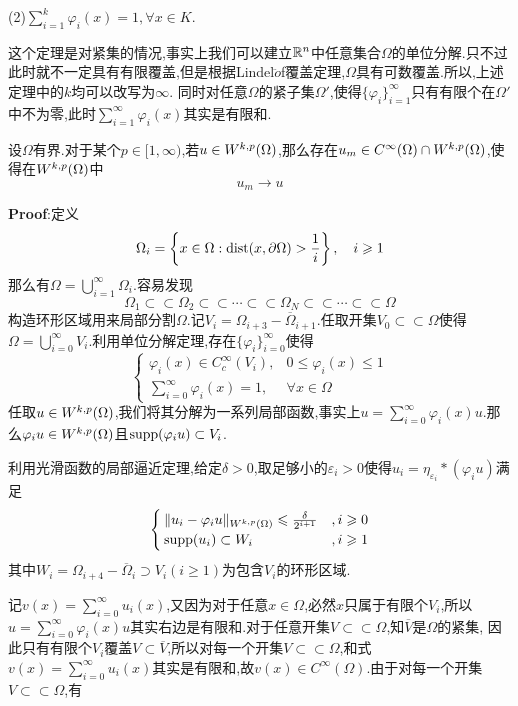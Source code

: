    (2)$\sum^k_{i=1}\varphi _i(x)=1,\forall x\in K$.\par
这个定理是对紧集的情况,事实上我们可以建立$\mathbb{R}^n$中任意集合$\Omega$的单位分解.只不过此时就不一定具有有限覆盖,但是根据Lindel$\ddot{o}$f覆盖定理,$\Omega$具有可数覆盖.所以,上述定理中的$k$均可以改写为$\infty$.
同时对任意$\Omega$的紧子集$\Omega'$,使得$\{\varphi_i\}_{i=1}^{\infty}$只有有限个在$\Omega'$中不为零,此时$\sum^{\infty}_{i=1}\varphi _i(x)$其实是有限和.\par
\begin{tcolorbox}[colback=KuangNei,colframe=BianKuang,title=\textbf{光滑函数的全局逼近},sharpish corners]
   设$\Omega$有界.对于某个$p\in[1,\infty)$,若$u\in W^{k,p}(\Omega)$,那么存在$u_m\in C^{\infty}(\Omega)\cap W^{k,p}(\Omega)$,使得在$W^{k,p}(\Omega)$中
   $$
    u_m\to u
   $$
\end{tcolorbox}
\textbf{Proof}:定义
$$
\Omega_{i}=\left\{x\in \Omega:\operatorname{dist}(x,\partial \Omega)>\frac{1}{i}\right\},\quad i\geqslant 1
$$
那么有$\Omega=\bigcup_{i=1}^{\infty}\Omega_i$.容易发现
$$
\Omega_1\subset\subset \Omega_2\subset\subset\cdots\subset\subset \Omega_N\subset\subset\cdots\subset\subset\Omega
$$
构造环形区域用来局部分割$\Omega$.记$V_i=\Omega_{i+3}-\overline{\Omega}_{i+1}$.任取开集$V_0\subset\subset \Omega$使得$\Omega=\bigcup_{i=0}^{\infty}V_i$.利用单位分解定理,存在$\{\varphi_i\}_{i=0}^{\infty}$使得
$$
\begin{cases}
    \varphi_i(x)\in C^{\infty}_{c}(V_i),& 0\leqslant \varphi_i(x)\leqslant 1\\
    \sum^{\infty}_{i=0}\varphi_i(x)=1,&\forall x\in \Omega
\end{cases}
$$
任取$u\in W^{k,p}(\Omega)$,我们将其分解为一系列局部函数,事实上$u=\sum^{\infty}_{i=0}\varphi_i(x)u$.那么$\varphi_iu\in W^{k,p}(\Omega)$且$\operatorname{supp} (\varphi_iu)\subset V_i$.\par
利用光滑函数的局部逼近定理,给定$\delta>0$,取足够小的$\varepsilon_i>0$使得$u_i=\eta_{\varepsilon_i}\ast (\varphi_iu)$满足
$$
\begin{cases}
    \|u_i-\varphi_iu\|_{W^{k,p}(\Omega)}\leqslant\frac{\delta}{2^{i+1}} &,i\geqslant 0\\
    \operatorname{supp}(u_i)\subset W_i&,i\geqslant 1
\end{cases}
$$
其中$W_i=\Omega_{i+4}-\overline{\Omega}_i\supset V_i(i\geqslant 1)$为包含$V_i$的环形区域.\par
记$v(x)=\sum^{\infty}_{i=0}u_i(x)$,又因为对于任意$x\in\Omega$,必然$x$只属于有限个$V_i$,所以$u=\sum^{\infty}_{i=0}\varphi_i(x)u$其实右边是有限和.对于任意开集$V\subset\subset\Omega$,知$\overline{V}$是$\Omega$的紧集,
因此只有有限个$V_i$覆盖$V\subset\overline{V}$,所以对每一个开集$V\subset\subset\Omega$,和式$v(x)=\sum^{\infty}_{i=0}u_i(x)$其实是有限和,故$v(x)\in C^{\infty}(\Omega)$.由于对每一个开集$V\subset\subset\Omega$,有
